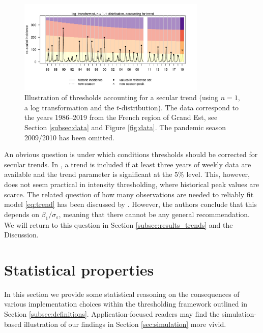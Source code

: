 \documentclass[12pt]{article}
\begin{document}
\begin{figure}[h!]
\begin{center}
\includegraphics[width = 0.8\textwidth]{figure/illustration_trend.pdf}\vspace{-5mm}
\end{center}
\caption{Illustration of thresholds accounting for a secular trend (using $n = 1$, a log transformation and the $t$-distribution). The data correspond to the years 1986--2019 from the French region of Grand Est, see Section \ref{subsec:data} and Figure \ref{fig:data}. The pandemic season 2009/2010 has been omitted.}
\label{fig:illustration_trend}
\end{figure}



An obvious question is under which conditions thresholds should be corrected for secular trends. In \cite{Farrington1996}, a trend is included if at least three years of weekly data are available and the trend parameter is significant at the 5\% level. This, however, does not seem practical in intensity thresholding, where historical peak values are scarce. The related question of how many observations are needed to reliably fit model \eqref{eq:trend} has been discussed by \cite{Hyndman2007}. However, the authors conclude that this depends on $\beta_1/\sigma_\varepsilon$, meaning that there cannot be any general recommendation. We will return to this question in Section \ref{subsec:results_trends} and the Discussion.

 
\section{Statistical properties}
\label{sec:analytical_results}

In this section we provide some statistical reasoning on the consequences of various implementation choices within the thresholding framework outlined in Section \ref{subsec:definitions}. Application-focused readers may find the simulation-based illustration of our findings in Section \ref{sec:simulation} more vivid.
\end{document}
